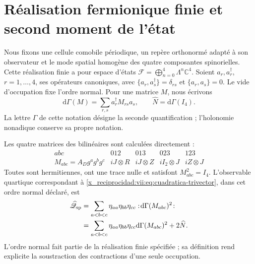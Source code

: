 \section{Réalisation fermionique finie et second moment de l'état}
\label{x_reciprocidad:vii:subsec:segundo-momento-car}

Nous fixons une cellule comobile périodique, un repère orthonormé adapté à son
observateur et le mode spatial homogène des quatre composantes
spinorielles. Cette réalisation finie a pour espace d'états
\(\mathcal F=\bigoplus_{n=0}^4\Lambda^n\mathbb C^4\).
Soient \(a_r,a_r^\dagger\), \(r=1,\ldots,4\), ses opérateurs
canoniques, avec
\(\{a_r,a_s^\dagger\}=\delta_{rs}\) et
\(\{a_r,a_s\}=0\). Le vide d'occupation fixe l'ordre
normal. Pour une matrice \(M\), nous écrivons
\[
 \mathrm d\Gamma(M)=\sum_{r,s}a_r^\dagger M_{rs}a_s,
 \qquad \widehat N=\mathrm d\Gamma(I_4).
\]
La lettre \(\Gamma\) de cette notation désigne la seconde
quantification ; l'holonomie nonadique conserve sa propre notation.

Les quatre matrices des bilinéaires sont calculées directement :
\begin{equation}
 \begin{array}{c|cccc}
 abc&012&013&023&123\\ \hline
 M_{abc}=A_Dg^ag^bg^c
       &iJ\otimes R&iJ\otimes Z&iI_2\otimes J&iZ\otimes J
 \end{array}
 \label{x_reciprocidad:vii:eq:matrices-bilineales-espin}
\end{equation}
Toutes sont hermitiennes, ont une trace nulle et satisfont \(M_{abc}^2=I_4\). L'observable quartique correspondant à \eqref{x_reciprocidad:vii:eq:cuadratica-trivector}, dans cet ordre normal déclaré, est
\begin{equation}
 \begin{split}
 \widehat{\mathscr Q}_{\rm sp}
 &=\sum_{a<b<c}\eta_{aa}\eta_{bb}\eta_{cc}
       :\!\mathrm d\Gamma(M_{abc})^2\!:\\
 &=\sum_{a<b<c}\eta_{aa}\eta_{bb}\eta_{cc}
       \mathrm d\Gamma(M_{abc})^2+2\widehat N.
 \end{split}
 \label{x_reciprocidad:vii:eq:observable-cuadratico-espin}
\end{equation}
L'ordre normal fait partie de la réalisation finie spécifiée ;
sa définition rend explicite la soustraction des contractions
d'une seule occupation.

